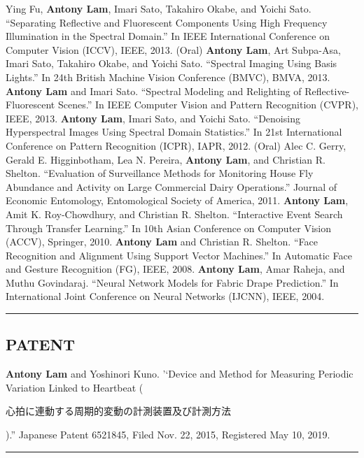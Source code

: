 \documentclass[letterpaper,10pt]{article}
\newcommand{\myline}{ \rule{\textwidth}{0.01in} }
\begin{document}
\vspace{0.05in}\newline
Ying Fu, \textbf{Antony Lam}, Imari Sato, Takahiro Okabe, and Yoichi Sato. ``Separating Reflective and Fluorescent Components Using High Frequency Illumination in the Spectral Domain.'' In IEEE International Conference on Computer Vision (ICCV), IEEE, 2013. (Oral)
\vspace{0.05in}\newline\newline
\textbf{Antony Lam}, Art Subpa-Asa, Imari Sato, Takahiro Okabe, and Yoichi Sato. ``Spectral Imaging Using Basis Lights.'' In 24th British Machine Vision Conference (BMVC), BMVA, 2013.
\vspace{0.05in}\newline
\textbf{Antony Lam} and Imari Sato. ``Spectral Modeling and Relighting of Reflective-Fluorescent Scenes.'' In IEEE Computer Vision and Pattern Recognition (CVPR), IEEE, 2013.
\vspace{0.05in}\newline
\textbf{Antony Lam}, Imari Sato, and Yoichi Sato. ``Denoising Hyperspectral Images Using Spectral Domain Statistics.'' In 21st International Conference on Pattern Recognition (ICPR), IAPR, 2012. (Oral)
\vspace{0.05in}\newline
Alec C. Gerry, Gerald E. Higginbotham, Lea N. Pereira, \textbf{Antony Lam}, and Christian R. Shelton. ``Evaluation of Surveillance Methods for Monitoring House Fly Abundance and Activity on Large Commercial Dairy Operations.'' Journal of Economic Entomology, Entomological Society of America, 2011.
\vspace{0.05in}\newline
\textbf{Antony Lam}, Amit K. Roy-Chowdhury, and Christian R. Shelton. ``Interactive Event Search Through Transfer Learning.'' In 10th Asian Conference on Computer Vision (ACCV), Springer, 2010.
\vspace{0.05in}\newline
\textbf{Antony Lam} and Christian R. Shelton. ``Face Recognition and Alignment Using Support Vector Machines.'' In Automatic Face and Gesture Recognition (FG), IEEE, 2008.
\vspace{0.05in}\newline
\textbf{Antony Lam}, Amar Raheja, and Muthu Govindaraj. ``Neural Network Models for Fabric Drape Prediction.'' In International Joint Conference on Neural Networks (IJCNN), IEEE, 2004.
\myline
\subsection*{PATENT}
\textbf{Antony Lam} and Yoshinori Kuno. '`Device and Method for Measuring
Periodic Variation Linked to Heartbeat ({\begin{CJK}{UTF8}{min}\begin{small}心拍に連動する周期的変動の計測装置及び計測方法\end{small}\end{CJK}}).''
Japanese Patent 6521845, Filed Nov. 22, 2015, Registered May 10, 2019. 
\myline
\end{document}
